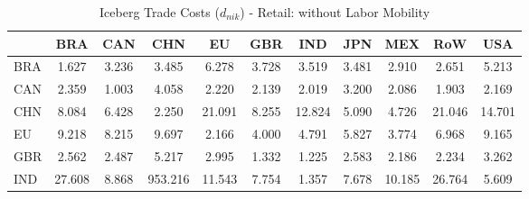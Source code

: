 \begin{table}[htbp]
\centering
\caption{Iceberg Trade Costs ($d_{nik}$) - Retail: without Labor Mobility} 
\label{tab:iceberg_Retail}
\begin{tabular}{lcccccccccc}
  \hline
 & BRA & CAN & CHN & EU & GBR & IND & JPN & MEX & RoW & USA \\ 
  \hline
BRA & \textcolor[RGB]{240,155,15}{1.627} & \textcolor[RGB]{171,111,84}{3.236} & \textcolor[RGB]{158,102,97}{3.485} & \textcolor[RGB]{84,54,171}{6.278} & \textcolor[RGB]{148,96,107}{3.728} & \textcolor[RGB]{153,99,102}{3.519} & \textcolor[RGB]{161,104,94}{3.481} & \textcolor[RGB]{181,117,74}{2.910} & \textcolor[RGB]{186,120,69}{2.651} & \textcolor[RGB]{105,68,150}{5.213} \\ 
  CAN & \textcolor[RGB]{207,134,48}{2.359} & \textcolor[RGB]{252,163,3}{1.003} & \textcolor[RGB]{138,89,117}{4.058} & \textcolor[RGB]{214,139,41}{2.220} & \textcolor[RGB]{224,145,31}{2.139} & \textcolor[RGB]{232,150,23}{2.019} & \textcolor[RGB]{173,112,82}{3.200} & \textcolor[RGB]{227,147,28}{2.086} & \textcolor[RGB]{235,152,20}{1.903} & \textcolor[RGB]{219,142,36}{2.169} \\ 
  CHN & \textcolor[RGB]{66,43,189}{8.084} & \textcolor[RGB]{82,53,173}{6.428} & \textcolor[RGB]{209,135,46}{2.250} & \textcolor[RGB]{33,21,222}{21.091} & \textcolor[RGB]{61,40,194}{8.255} & \textcolor[RGB]{41,26,214}{12.824} & \textcolor[RGB]{107,69,148}{5.090} & \textcolor[RGB]{115,74,140}{4.726} & \textcolor[RGB]{36,23,219}{21.046} & \textcolor[RGB]{38,25,217}{14.701} \\ 
  EU & \textcolor[RGB]{51,33,204}{9.218} & \textcolor[RGB]{64,41,191}{8.215} & \textcolor[RGB]{48,31,207}{9.697} & \textcolor[RGB]{222,144,33}{2.166} & \textcolor[RGB]{140,91,115}{4.000} & \textcolor[RGB]{112,73,143}{4.791} & \textcolor[RGB]{92,59,163}{5.827} & \textcolor[RGB]{145,94,110}{3.774} & \textcolor[RGB]{77,50,178}{6.968} & \textcolor[RGB]{54,35,201}{9.165} \\ 
  GBR & \textcolor[RGB]{196,127,59}{2.562} & \textcolor[RGB]{199,129,56}{2.487} & \textcolor[RGB]{102,66,153}{5.217} & \textcolor[RGB]{176,114,79}{2.995} & \textcolor[RGB]{245,158,10}{1.332} & \textcolor[RGB]{247,160,8}{1.225} & \textcolor[RGB]{194,125,61}{2.583} & \textcolor[RGB]{217,140,38}{2.186} & \textcolor[RGB]{212,137,43}{2.234} & \textcolor[RGB]{168,109,87}{3.262} \\ 
  IND & \textcolor[RGB]{25,16,230}{27.608} & \textcolor[RGB]{56,36,199}{8.868} & \textcolor[RGB]{0,0,255}{953.216} & \textcolor[RGB]{43,28,212}{11.543} & \textcolor[RGB]{69,45,186}{7.754} & \textcolor[RGB]{242,157,13}{1.357} & \textcolor[RGB]{71,46,184}{7.678} & \textcolor[RGB]{46,30,209}{10.185} & \textcolor[RGB]{28,18,227}{26.764} & \textcolor[RGB]{97,63,158}{5.609} \\ 

\end{tabular}
\end{table}
